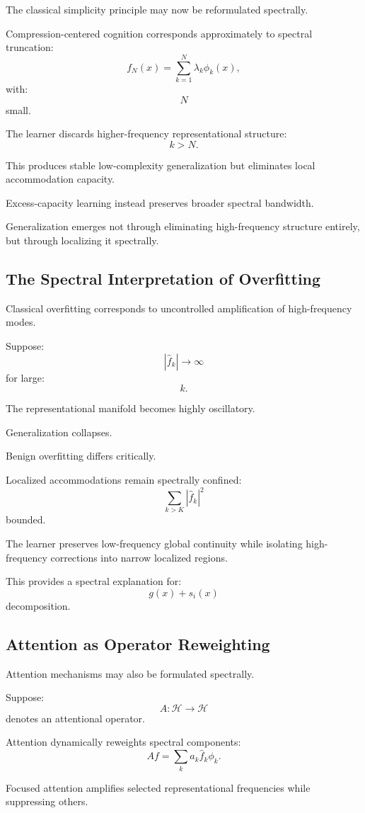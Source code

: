 \documentclass[12pt,a4paper]{article}
\begin{document}
The classical simplicity principle may now be reformulated spectrally.

Compression-centered cognition corresponds approximately to spectral truncation:
\[
f_N(x)
=
\sum_{k=1}^N
\lambda_k
\phi_k(x),
\]
with:
\[
N
\]
small.

The learner discards higher-frequency representational structure:
\[
k>N.
\]

This produces stable low-complexity generalization but eliminates local accommodation capacity.

Excess-capacity learning instead preserves broader spectral bandwidth.

Generalization emerges not through eliminating high-frequency structure entirely, but through localizing it spectrally.

\subsection{The Spectral Interpretation of Overfitting}

Classical overfitting corresponds to uncontrolled amplification of high-frequency modes.

Suppose:
\[
|\hat{f}_k|
\rightarrow
\infty
\]
for large:
\[
k.
\]

The representational manifold becomes highly oscillatory.

Generalization collapses.

Benign overfitting differs critically.

Localized accommodations remain spectrally confined:
\[
\sum_{k>K}
|\hat{f}_k|^2
\]
bounded.

The learner preserves low-frequency global continuity while isolating high-frequency corrections into narrow localized regions.

This provides a spectral explanation for:
\[
g(x)+s_i(x)
\]
decomposition.

\subsection{Attention as Operator Reweighting}

Attention mechanisms may also be formulated spectrally.

Suppose:
\[
A :
\mathcal{H}
\rightarrow
\mathcal{H}
\]
denotes an attentional operator.

Attention dynamically reweights spectral components:
\[
Af
=
\sum_k
a_k
\hat{f}_k
\phi_k.
\]

Focused attention amplifies selected representational frequencies while suppressing others.
\end{document}
